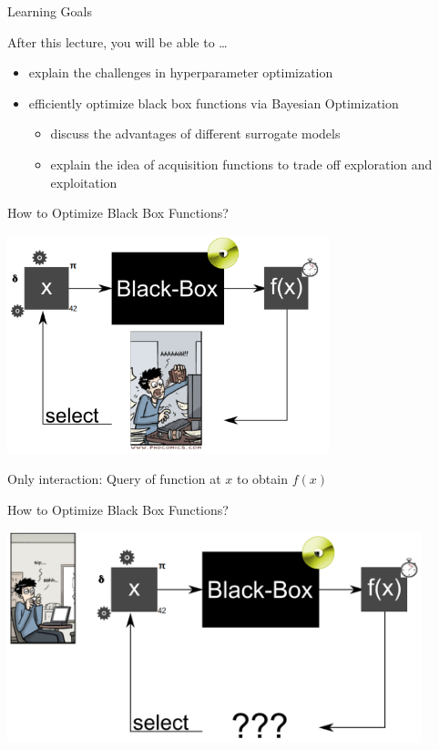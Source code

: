 \begin{frame}[c]{Learning Goals}

After this lecture, you will be able to \ldots

\begin{itemize}
  \item explain the \alert{challenges in hyperparameter optimization}
  \item efficiently optimize black box functions via \alert{Bayesian Optimization}
  \begin{itemize}
    \item discuss the advantages of different \alert{surrogate models}
    \item explain the idea of \alert{acquisition functions} to trade off exploration and exploitation
  \end{itemize}
\end{itemize}


\end{frame}
\begin{frame}[c]{How to Optimize Black Box Functions?}

\centering
\includegraphics[width=0.7\textwidth]{images/black_box_manual_opt.png}

Only interaction: Query of function at $x$ to obtain $f(x)$

\end{frame}
\begin{frame}[c]{How to Optimize Black Box Functions?}

\centering
\includegraphics[width=0.9\textwidth]{images/black_box_aut_opt.png}

\end{frame}
